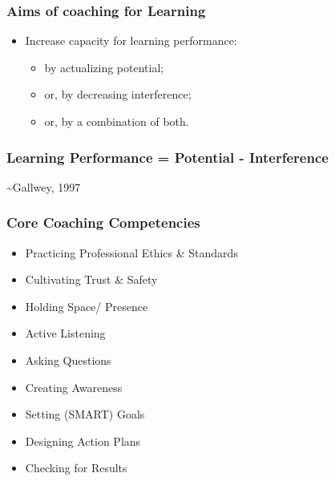 \documentclass[
]{book}
\providecommand{\tightlist}{%
  \setlength{\itemsep}{0pt}\setlength{\parskip}{0pt}}
\begin{document}
\hypertarget{aims-of-coaching-for-learning}{%
\subsubsection*{Aims of coaching for Learning}\label{aims-of-coaching-for-learning}}

\begin{itemize}
\tightlist
\item
  Increase capacity for learning performance:

  \begin{itemize}
  \tightlist
  \item
    by actualizing potential;
  \item
    or, by decreasing interference;
  \item
    or, by a combination of both.
  \end{itemize}
\end{itemize}

\hypertarget{learning-performance-potential---interference}{%
\subsubsection*{Learning Performance = Potential - Interference}\label{learning-performance-potential---interference}}

\textasciitilde Gallwey, 1997

\hypertarget{core-coaching-competencies}{%
\subsubsection*{Core Coaching Competencies}\label{core-coaching-competencies}}

\begin{itemize}
\tightlist
\item
  Practicing Professional Ethics \& Standards
\item
  Cultivating Trust \& Safety
\item
  Holding Space/ Presence
\item
  Active Listening
\item
  Asking Questions
\item
  Creating Awareness
\item
  Setting (SMART) Goals
\item
  Designing Action Plans
\item
  Checking for Results
\end{itemize}
\end{document}
